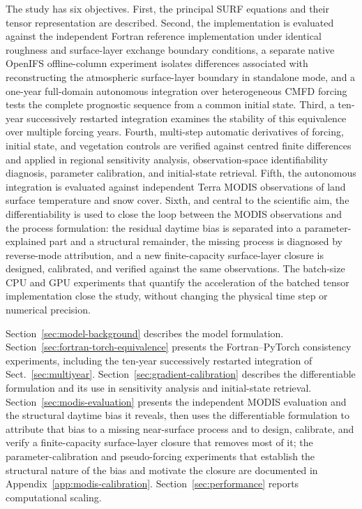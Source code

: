 The study has six objectives. First, the principal SURF equations and their
tensor representation are described. Second, the implementation is evaluated
against the independent Fortran reference implementation under identical
roughness and surface-layer exchange boundary conditions, a separate native OpenIFS offline-column experiment
isolates differences associated with reconstructing the atmospheric
surface-layer boundary in standalone mode, and a one-year full-domain
autonomous integration over heterogeneous CMFD forcing tests the complete
prognostic sequence from a common initial state. Third, a ten-year successively restarted
integration examines the stability of this equivalence over multiple forcing
years. Fourth,
multi-step automatic derivatives of forcing, initial state, and vegetation
controls are verified against centred finite differences and applied in
regional sensitivity analysis, observation-space identifiability diagnosis,
parameter calibration, and initial-state retrieval. Fifth, the autonomous
integration is evaluated against independent Terra MODIS observations of land
surface temperature and snow cover. Sixth, and central to the
scientific aim, the differentiability is used to close the loop between the
MODIS observations and the process formulation: the residual daytime bias is
separated into a parameter-explained part and a structural remainder, the
missing process is diagnosed by reverse-mode attribution, and a new
finite-capacity surface-layer closure is designed, calibrated, and verified
against the same observations. The batch-size CPU
and GPU experiments that quantify the acceleration of the batched tensor
implementation close the study, without changing the physical time step or
numerical precision.

Section~\ref{sec:model-background} describes the model formulation.
Section~\ref{sec:fortran-torch-equivalence} presents the Fortran--PyTorch
consistency experiments, including the ten-year successively restarted integration of
Sect.~\ref{sec:multiyear}. Section~\ref{sec:gradient-calibration} describes
the differentiable formulation and its use in sensitivity analysis and
initial-state retrieval. Section~\ref{sec:modis-evaluation} presents the
independent MODIS evaluation and the structural daytime bias it reveals, then
uses the differentiable formulation to attribute that bias to a missing
near-surface process and to design, calibrate, and verify a finite-capacity
surface-layer closure that removes most of it; the
parameter-calibration and pseudo-forcing experiments that establish the
structural nature of the bias and motivate the closure are documented in
Appendix~\ref{app:modis-calibration}. Section~\ref{sec:performance}
reports computational scaling.

